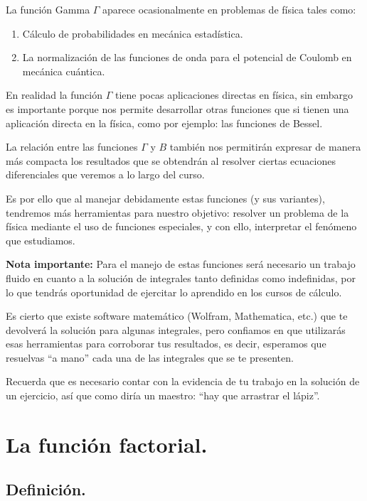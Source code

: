 La función Gamma $\Gamma$ aparece ocasionalmente en problemas de física tales como:
\begin{enumerate}
\item Cálculo de probabilidades en mecánica estadística.
\item La normalización de las funciones de onda para el potencial de Coulomb en mecánica cuántica.
\end{enumerate}
En realidad la función $\Gamma$ tiene pocas aplicaciones directas en física, sin embargo es importante porque nos permite desarrollar otras funciones que si tienen una aplicación directa en la física, como por ejemplo: las funciones de Bessel.
\par
La relación entre las funciones $\Gamma$ y $B$ también nos permitirán expresar de manera más compacta los resultados que se obtendrán al resolver ciertas ecuaciones diferenciales que veremos a lo largo del curso.
\par
Es por ello que al manejar debidamente estas funciones (y sus variantes), tendremos más herramientas para nuestro objetivo: resolver un problema de la física mediante el uso de funciones especiales, y con ello, interpretar el fenómeno que estudiamos.
\par
\textbf{Nota importante: }Para el manejo de estas funciones será necesario un trabajo fluido en cuanto a la solución de integrales tanto definidas como indefinidas, por lo que tendrás oportunidad de ejercitar lo aprendido en los cursos de cálculo.
\par
Es cierto que existe software matemático (Wolfram, Mathematica, etc.) que te devolverá la solución para algunas integrales, pero confiamos en que utilizarás esas herramientas para corroborar tus resultados, es decir, esperamos que resuelvas \enquote{a mano} cada una de las integrales que se te presenten.
\par
Recuerda que es necesario contar con la evidencia de tu trabajo en la solución de un ejercicio, así que como diría un maestro: \enquote{hay que arrastrar el lápiz}.

\section{La función factorial.}

\subsection{Definición.}

